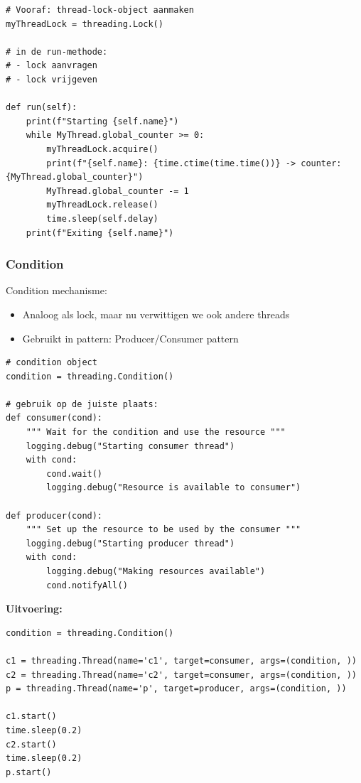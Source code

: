 \documentclass{article}
\begin{document}
\begin{verbatim}
# Vooraf: thread-lock-object aanmaken
myThreadLock = threading.Lock()

# in de run-methode:
# - lock aanvragen
# - lock vrijgeven

def run(self):
    print(f"Starting {self.name}")
    while MyThread.global_counter >= 0:
        myThreadLock.acquire()
        print(f"{self.name}: {time.ctime(time.time())} -> counter: {MyThread.global_counter}")
        MyThread.global_counter -= 1
        myThreadLock.release()
        time.sleep(self.delay)
    print(f"Exiting {self.name}")
\end{verbatim}

\subsubsection{Condition}

Condition mechanisme:

\begin{itemize}
    \item Analoog als lock, maar nu verwittigen we ook andere threads
    \item Gebruikt in pattern: Producer/Consumer pattern
\end{itemize}


\begin{verbatim}
# condition object
condition = threading.Condition()

# gebruik op de juiste plaats:
def consumer(cond):
    """ Wait for the condition and use the resource """
    logging.debug("Starting consumer thread")
    with cond:
        cond.wait()
        logging.debug("Resource is available to consumer")
    
def producer(cond):
    """ Set up the resource to be used by the consumer """
    logging.debug("Starting producer thread")
    with cond:
        logging.debug("Making resources available")
        cond.notifyAll()
\end{verbatim}

\textbf{Uitvoering:}

\begin{verbatim}
condition = threading.Condition()

c1 = threading.Thread(name='c1', target=consumer, args=(condition, ))
c2 = threading.Thread(name='c2', target=consumer, args=(condition, ))
p = threading.Thread(name='p', target=producer, args=(condition, ))

c1.start()
time.sleep(0.2)
c2.start()
time.sleep(0.2)
p.start()
\end{verbatim}
\end{document}
